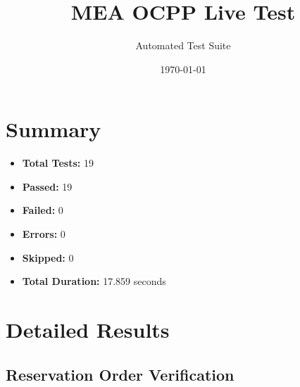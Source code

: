 \documentclass{article}
\title{MEA OCPP Live Test}
\author{Automated Test Suite}
\date{\today}
\begin{document}
\maketitle

\section{Summary}
\begin{itemize}
    \item \textbf{Total Tests:} 19
    \item \textbf{Passed:} 19
    \item \textbf{Failed:} 0
    \item \textbf{Errors:} 0
    \item \textbf{Skipped:} 0
    \item \textbf{Total Duration:} 17.859 seconds
\end{itemize}

\section{Detailed Results}
\subsection{Reservation Order Verification}
\end{document}
